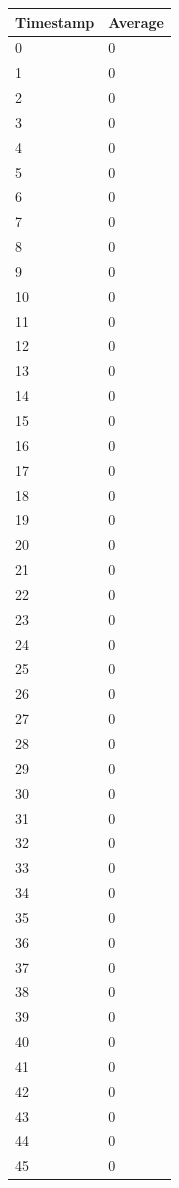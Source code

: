 %
%
\begin{tabular}{|l||l|}
\hline
	\textbf{Timestamp} & \textbf{Average} \\ \hline
	0 & 0 \\ \hline
	1 & 0 \\ \hline
	2 & 0 \\ \hline
	3 & 0 \\ \hline
	4 & 0 \\ \hline
	5 & 0 \\ \hline
	6 & 0 \\ \hline
	7 & 0 \\ \hline
	8 & 0 \\ \hline
	9 & 0 \\ \hline
	10 & 0 \\ \hline
	11 & 0 \\ \hline
	12 & 0 \\ \hline
	13 & 0 \\ \hline
	14 & 0 \\ \hline
	15 & 0 \\ \hline
	16 & 0 \\ \hline
	17 & 0 \\ \hline
	18 & 0 \\ \hline
	19 & 0 \\ \hline
	20 & 0 \\ \hline
	21 & 0 \\ \hline
	22 & 0 \\ \hline
	23 & 0 \\ \hline
	24 & 0 \\ \hline
	25 & 0 \\ \hline
	26 & 0 \\ \hline
	27 & 0 \\ \hline
	28 & 0 \\ \hline
	29 & 0 \\ \hline
	30 & 0 \\ \hline
	31 & 0 \\ \hline
	32 & 0 \\ \hline
	33 & 0 \\ \hline
	34 & 0 \\ \hline
	35 & 0 \\ \hline
	36 & 0 \\ \hline
	37 & 0 \\ \hline
	38 & 0 \\ \hline
	39 & 0 \\ \hline
	40 & 0 \\ \hline
	41 & 0 \\ \hline
	42 & 0 \\ \hline
	43 & 0 \\ \hline
	44 & 0 \\ \hline
	45 & 0 \\ \hline
\end{tabular}
